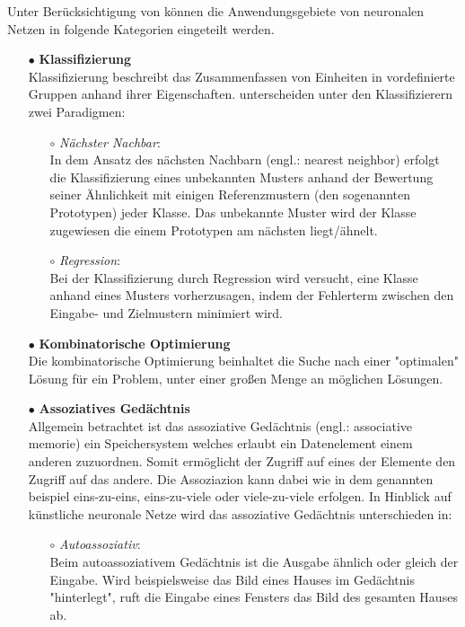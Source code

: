 Unter Berücksichtigung von \citet{Fiesler96} können die Anwendungsgebiete von neuronalen Netzen in folgende Kategorien eingeteilt werden.
\begin{itemize}
\item[\textbf{$\bullet$}] \textbf{Klassifizierung}\\%
Klassifizierung beschreibt das Zusammenfassen von Einheiten in vordefinierte Gruppen anhand ihrer Eigenschaften.
\citet{Fiesler96} unterscheiden unter den Klassifizierern zwei Paradigmen:
    \begin{itemize}
    \item[$\circ$] \textit{Nächster Nachbar}:\\%
    In dem Ansatz des nächsten Nachbarn (engl.: nearest neighbor) erfolgt die Klassifizierung eines unbekannten Musters anhand der Bewertung seiner Ähnlichkeit mit einigen Referenzmustern (den sogenannten Prototypen) jeder Klasse. Das unbekannte Muster wird der Klasse zugewiesen die einem Prototypen am nächsten liegt/ähnelt.
    
    \item[$\circ$] \textit{Regression}:\\%
    Bei der Klassifizierung durch Regression wird versucht, eine Klasse anhand eines Musters vorherzusagen, indem der Fehlerterm zwischen den Eingabe- und Zielmustern minimiert wird.
    \end{itemize}


\item[\textbf{$\bullet$}] \textbf{Kombinatorische Optimierung}\\%
Die kombinatorische Optimierung beinhaltet die Suche nach einer "optimalen" Lösung für ein Problem, unter einer großen Menge an möglichen Lösungen. 
 

\item[\textbf{$\bullet$}] \textbf{Assoziatives Gedächtnis}\\%
Allgemein betrachtet ist das assoziative Gedächtnis (engl.: associative memorie) ein Speichersystem welches erlaubt ein Datenelement einem anderen zuzuordnen. Somit ermöglicht der Zugriff auf eines der Elemente den Zugriff auf das andere.
Die Assoziazion kann dabei wie in dem genannten beispiel eins-zu-eins, eins-zu-viele oder viele-zu-viele erfolgen.
In Hinblick auf künstliche neuronale Netze wird das assoziative Gedächtnis unterschieden in:
    \begin{itemize}
    \item[$\circ$] \textit{Autoassoziativ}:\\%
    Beim autoassoziativem Gedächtnis ist die Ausgabe ähnlich oder gleich der Eingabe. Wird beispielsweise das Bild eines Hauses im Gedächtnis "hinterlegt", ruft die Eingabe eines Fensters das Bild des gesamten Hauses ab.
    

\end{itemize}
\end{itemize}
